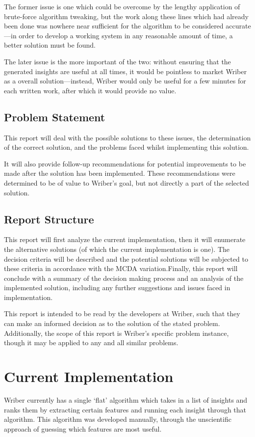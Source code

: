 \documentclass[12pt]{article}
\begin{document}
The former issue is one which could be overcome by the lengthy application of brute-force algorithm tweaking, but the work along these lines which had already been done was nowhere near sufficient for the algorithm to be considered accurate---in order to develop a working system in any reasonable amount of time, a better solution must be found.

The later issue is the more important of the two: without ensuring that the generated insights are useful at all times, it would be pointless to market Wriber as a overall solution---instead, Wriber would only be useful for a few minutes for each written work, after which it would provide no value.

\subsection{Problem Statement}
This report will deal with the possible solutions to these issues, the determination of the correct solution, and the problems faced whilst implementing this solution.

It will also provide follow-up recommendations for potential improvements to be made after the solution has been implemented. These recommendations were determined to be of value to Wriber's goal, but not directly a part of the selected solution.

\subsection{Report Structure}
This report will first analyze the current implementation, then it will enumerate the alternative solutions (of which the current implementation is one). The decision criteria will be described and the potential solutions will be subjected to these criteria in accordance with the MCDA variation.\@ Finally, this report will conclude with a summary of the decision making process and an analysis of the implemented solution, including any further suggestions and issues faced in implementation.

This report is intended to be read by the developers at Wriber, such that they can make an informed decision as to the solution of the stated problem. Additionally, the scope of this report is Wriber's specific problem instance, though it may be applied to any and all similar problems.
\newpage


\section{Current Implementation}
Wriber currently has a single `flat' algorithm which takes in a list of insights and ranks them by extracting certain features and running each insight through that algorithm. This algorithm was developed manually, through the unscientific approach of guessing which features are most useful.
\end{document}
